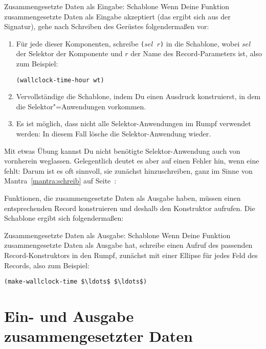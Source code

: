 \begin{konstruktionsanleitung}{Zusammengesetzte Daten als Eingabe:
    Schablone}
  \label{ka:zusammengesetzt-eingabe-schablone}
  Wenn Deine Funktion zusammengesetzte Daten als Eingabe akzeptiert
  (das ergibt sich aus der Signatur), gehe nach Schreiben des Gerüstes
  folgendermaßen vor:
%
\begin{enumerate}
\item Für jede dieser Komponenten, schreibe  \texttt{($\mathit{sel}$ $r$)} in die
  Schablone, wobei $\mathit{sel}$ der Selektor der Komponente und $r$ der Name
  des Record-Parameters ist, also zum Beispiel:
\begin{lstlisting}
(wallclock-time-hour wt)
\end{lstlisting}
\item Vervollständige die Schablone, indem Du einen Ausdruck
  konstruierst, in dem die Selektor"=Anwendungen vorkommen.
\item Es ist möglich, dass nicht alle Selektor-Anwendungen im Rumpf
  verwendet werden: In diesem Fall lösche die Selektor-Anwendung
  wieder.
\end{enumerate}
%
\end{konstruktionsanleitung}
%
Mit etwas Übung kannst Du nicht benötigte Selektor-Anwendung auch von
vornherein weglassen.  Gelegentlich deutet es aber auf einen Fehler
hin, wenn eine fehlt: Darum ist es oft sinnvoll, sie zunächst
hinzuschreiben, ganz im Sinne von Mantra~\ref{mantra:schreib} auf
Seite~\pageref{mantra:schreib}:

\mantraschreib*

\noindent Funktionen, die zusammengesetzte Daten als Ausgabe haben, müssen einen
entsprechenden Record konstruieren und deshalb den Konstruktor
aufrufen.  Die Schablone ergibt sich folgendermaßen:
%
\begin{konstruktionsanleitung}{Zusammengesetzte Daten als Ausgabe:
    Schablone}
    \label{ka:zusammengesetzt-ausgabe-schablone}
  Wenn Deine Funktion zusammengesetzte Daten als Ausgabe hat, schreibe
  einen Aufruf des passenden Record-Konstruktors in den Rumpf,
  zunächst mit einer Ellipse für jedes Feld des Records, also zum
  Beispiel:
\begin{lstlisting}
(make-wallclock-time $\ldots$ $\ldots$)
\end{lstlisting}

\end{konstruktionsanleitung}

\section{Ein- und Ausgabe zusammengesetzter Daten}
\label{sec:armadillo}

